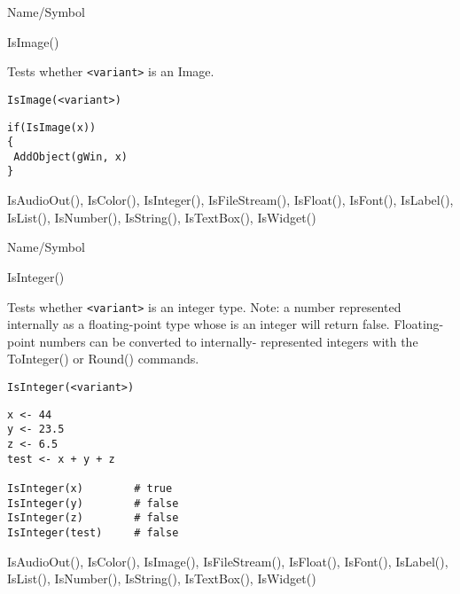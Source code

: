 \rl




\begin{desc}{Name/Symbol}
\item[Name/Symbol]	IsImage()

\item[Description]	Tests whether \verb+<variant>+ is an Image.

\item[Usage]
\begin{verbatim}
IsImage(<variant>)
\end{verbatim}

\item[Example]	
\begin{verbatim}
if(IsImage(x))
{
 AddObject(gWin, x)
}
\end{verbatim}

\item[See Also]	IsAudioOut(), IsColor(), IsInteger(), IsFileStream(), 
		IsFloat(), IsFont(), IsLabel(), IsList(), IsNumber(), 
		IsString(), IsTextBox(), IsWidget()
\end{desc}

\rl




\begin{desc}{Name/Symbol}
\item[Name/Symbol]	IsInteger()

\item[Description]	Tests whether \verb+<variant>+ is an integer type.  
		Note: a number represented internally as a floating-point
	     	type whose is an integer will return false.  
	Floating-point numbers can be converted to internally- 
	represented integers with the ToInteger() or Round() commands.
 
\item[Usage]		
\begin{verbatim}
IsInteger(<variant>)
\end{verbatim}

\item[Example]
\begin{verbatim}
x <- 44
y <- 23.5
z <- 6.5
test <- x + y + z 
	
IsInteger(x)		# true
IsInteger(y)		# false
IsInteger(z)		# false
IsInteger(test)		# false
\end{verbatim}

\item[See Also]	IsAudioOut(), IsColor(), IsImage(), IsFileStream(), 
	IsFloat(), IsFont(), IsLabel(), IsList(), IsNumber(), 
	IsString(), IsTextBox(), IsWidget()
\end{desc}

